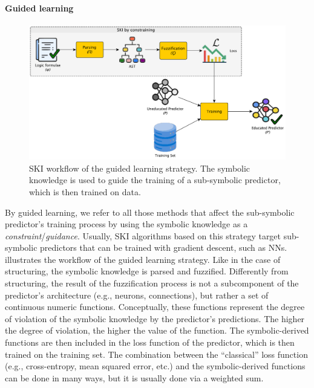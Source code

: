 \paragraph{Guided learning}\label{par:guided-learning}
%
\begin{figure}
    \centering
    \includegraphics[width=.9\linewidth]{figures/workflow-constraining}
    \caption[SKI workflow of guided learning strategy]{
        \gls{SKI} workflow of the guided learning strategy.
        The symbolic knowledge is used to guide the training of a sub-symbolic predictor, which is then trained on data.
    }
    \label{fig:workflow-learning}
\end{figure}
%
By guided learning, we refer to all those methods that affect the sub-symbolic predictor's training process by using the symbolic knowledge as a \emph{constraint}/\emph{guidance}.
%
Usually, \gls{SKI} algorithms based on this strategy target sub-symbolic predictors that can be trained with gradient descent, such as \glspl{NN}.
%
 illustrates the workflow of the guided learning strategy.
%
Like in the case of structuring, the symbolic knowledge is parsed and fuzzified.
%
Differently from structuring, the result of the fuzzification process is not a subcomponent of the predictor's architecture (e.g., neurons, connections), but rather a set of continuous numeric functions.
%
Conceptually, these functions represent the degree of violation of the symbolic knowledge by the predictor's predictions.
%
The higher the degree of violation, the higher the value of the function.
%
The symbolic-derived functions are then included in the loss function of the predictor, which is then trained on the training set.
%
The combination between the ``classical'' loss function (e.g., cross-entropy, mean squared error, etc.) and the symbolic-derived functions can be done in many ways, but it is usually done via a weighted sum.



